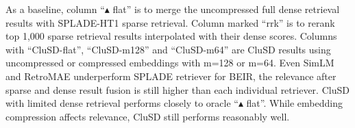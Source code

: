 As a baseline, column ``$\blacktriangle$ flat'' is to merge  the uncompressed full dense retrieval results with SPLADE-HT1 sparse  retrieval.
Column marked ``rrk'' is to rerank   top 1,000  sparse retrieval results interpolated with their dense scores. 
Columns with ``CluSD-flat'', ``CluSD-m128'' and ``CluSD-m64''  are  CluSD results  using uncompressed or compressed embeddings with
m=128 or m=64. 
Even SimLM and RetroMAE  underperform SPLADE retriever for BEIR,  the relevance after sparse and dense  result fusion
is still higher than each individual retriever.
CluSD with limited dense retrieval   performs  closely to   oracle ``$\blacktriangle$ flat''.
While embedding compression affects relevance,  CluSD still performs reasonably well.  
  
